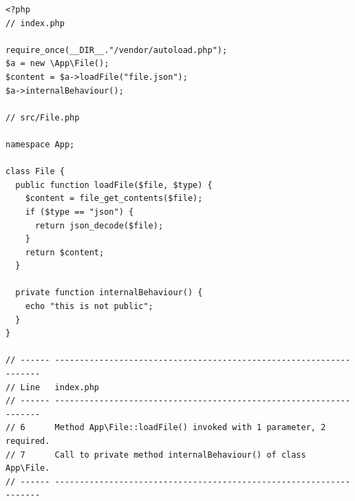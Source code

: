 \begin{verbatim}
<?php
// index.php

require_once(__DIR__."/vendor/autoload.php");
$a = new \App\File();
$content = $a->loadFile("file.json");
$a->internalBehaviour();

// src/File.php

namespace App;

class File {
  public function loadFile($file, $type) {
    $content = file_get_contents($file);
    if ($type == "json") {
      return json_decode($file);
    }
    return $content;
  }
  
  private function internalBehaviour() {
    echo "this is not public";
  }
}

// ------ ------------------------------------------------------------------- 
// Line   index.php                                                          
// ------ ------------------------------------------------------------------- 
// 6      Method App\File::loadFile() invoked with 1 parameter, 2 required.  
// 7      Call to private method internalBehaviour() of class App\File.      
// ------ ------------------------------------------------------------------- 

\end{verbatim}
\label{annexe:php-error}
